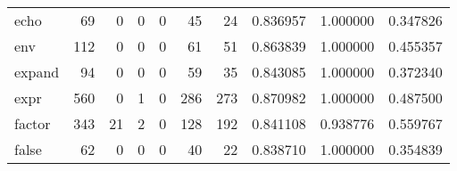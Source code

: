 \begin{longtable}{lrrrrrrrrr}
echo      &                                    69 &                                                  0 &                                                  0 &                                                  0 &                                                 45 &                                                 24 &                                           0.836957 &                               1.000000 &                             0.347826 \\
env       &                                   112 &                                                  0 &                                                  0 &                                                  0 &                                                 61 &                                                 51 &                                           0.863839 &                               1.000000 &                             0.455357 \\
expand    &                                    94 &                                                  0 &                                                  0 &                                                  0 &                                                 59 &                                                 35 &                                           0.843085 &                               1.000000 &                             0.372340 \\
expr      &                                   560 &                                                  0 &                                                  1 &                                                  0 &                                                286 &                                                273 &                                           0.870982 &                               1.000000 &                             0.487500 \\
factor    &                                   343 &                                                 21 &                                                  2 &                                                  0 &                                                128 &                                                192 &                                           0.841108 &                               0.938776 &                             0.559767 \\
false     &                                    62 &                                                  0 &                                                  0 &                                                  0 &                                                 40 &                                                 22 &                                           0.838710 &                               1.000000 &                             0.354839 \\

\end{longtable}
